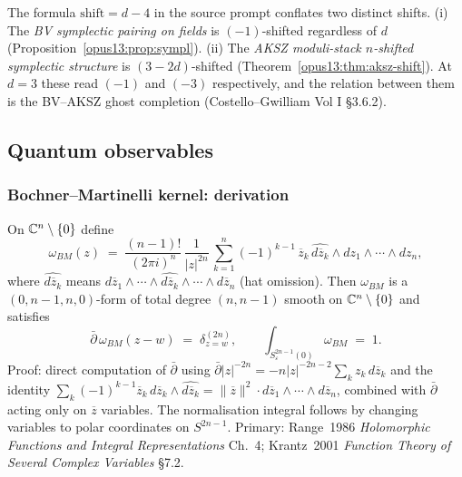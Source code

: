 \begin{remark}[Why the source prompt's ``shift = d-4'' does not parse literally]\ClaimStatusRemark
\label{opus13:rem:shift-law-disambiguation}
The formula $\mathrm{shift} = d - 4$ in the source prompt conflates two
distinct shifts. (i) The \emph{BV symplectic pairing on fields} is
$(-1)$-shifted regardless of $d$ (Proposition~\ref{opus13:prop:sympl}).
(ii) The \emph{AKSZ moduli-stack $n$-shifted symplectic structure} is
$(3-2d)$-shifted (Theorem~\ref{opus13:thm:aksz-shift}). At $d=3$ these
read $(-1)$ and $(-3)$ respectively, and the relation between them is
the BV--AKSZ ghost completion (Costello--Gwilliam Vol I §3.6.2).
\end{remark}


\subsection{Quantum observables}
\label{opus13:subsec:quantum}

\subsubsection{Bochner--Martinelli kernel: derivation}

\begin{lemma}\ClaimStatusLemma
\label{opus13:lem:BM}
On $\mathbb{C}^n \setminus \{0\}$ define
\begin{equation}
  \omega_{BM}(z) \;=\; \frac{(n-1)!}{(2\pi i)^n}\,\frac{1}{|z|^{2n}}\,
  \sum_{k=1}^n (-1)^{k-1}\,\overline{z}_k\,\widehat{d\overline{z}_k}
  \wedge dz_1\wedge\cdots\wedge dz_n,
  \label{opus13:eq:BM-defining}
\end{equation}
where $\widehat{d\overline{z}_k}$ means $d\overline{z}_1\wedge\cdots\wedge
\widehat{d\overline{z}_k}\wedge\cdots\wedge d\overline{z}_n$ (hat
omission). Then $\omega_{BM}$ is a $(0,n-1,n,0)$-form of total degree
$(n, n-1)$ smooth on $\mathbb{C}^n\setminus\{0\}$ and satisfies
\begin{equation}
  \bar\partial\,\omega_{BM}(z-w) \;=\; \delta_{z=w}^{(2n)},
  \qquad
  \int_{S^{2n-1}_\varepsilon(0)} \omega_{BM} \;=\; 1.
  \label{opus13:eq:BM-properties}
\end{equation}
Proof: direct computation of
$\bar\partial$ using
$\bar\partial|z|^{-2n} = -n|z|^{-2n-2}\sum_k z_k\,d\overline{z}_k$ and
the identity $\sum_k (-1)^{k-1}\overline{z}_k\,d\overline{z}_k\wedge
\widehat{d\overline{z}_k} = \|\overline{z}\|^2\cdot
d\overline{z}_1\wedge\cdots\wedge d\overline{z}_n$, combined with
$\bar\partial$ acting only on $\overline{z}$ variables. The
normalisation integral follows by changing variables to polar
coordinates on $S^{2n-1}$. Primary: Range~1986 \emph{Holomorphic
Functions and Integral Representations} Ch.~4; Krantz~2001
\emph{Function Theory of Several Complex Variables} §7.2.
\end{lemma}

